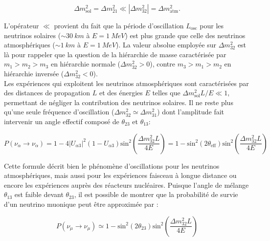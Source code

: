 \begin{equation}
    \Delta m^2_\textrm{sol} = \Delta m^2_{21} \ll \left| \Delta m_{32}^2 \right| = \Delta m^2_\textrm{atm}.
\end{equation}

\bigbreak

L'opérateur \og $\ll$ \fg{} provient du fait que la période d'oscillation $L_\textrm{osc}$ pour les neutrinos solaires ($\sim \SI{30}{km}$ à $E = \SI{1}{MeV}$) est plus grande que celle des neutrinos atmosphériques ($\sim \SI{1}{km}$ à $E = \SI{1}{MeV}$). La valeur absolue employée sur $\Delta m_{32}^2$ est là pour rappeler que la question de la hiérarchie de masse caractérisée par $m_1 > m_2 > m_3$ en hiérarchie \og normale \fg{} ($\Delta m_{32}^2 > 0$), contre $m_3 > m_1 > m_2$ en hiérarchie \og inversée \fg{} ($\Delta m_{32}^2 < 0$).\\

Les expériences qui exploitent les neutrinos atmosphériques sont caractérisées par des distances de propagation $L$ et des énergies $E$ telles que $\Delta m^2_\textrm{sol} L/E \ll 1$, permettant de négliger la contribution des neutrinos solaires. Il ne reste plus qu'une seule fréquence d'oscillation ($\Delta m^2_{32} \simeq \Delta m^2_{31}$) dont l'amplitude fait intervenir un angle effectif composé de $\theta_{23}$ et $\theta_{13}$:

\begin{equation}
\label{eq:general_atm_osc}
    P(\nu_\alpha \rightarrow \nu_\alpha ) = 1 - 4 \left|U_{\alpha 3}\right|^2 \left(1 - U_{\alpha 3}\right) \textrm{sin}^2\left(\frac{\Delta m^2_{32} L}{4E} \right) = 1 - \textrm{sin}^2\left(2 \theta_\textrm{eff} \right) \textrm{sin}^2\left(\frac{\Delta m^2_{32} L}{4E} \right)
\end{equation}

\bigbreak

Cette formule décrit bien le phénomène d'oscillations pour les neutrinos atmosphériques, mais aussi pour les expériences faisceau à longue distance ou encore les expériences auprès des réacteurs nucléaires. Puisque l'angle de mélange $\theta_{13}$ est faible devant $\theta_{23}$, il est possible de montrer que la probabilité de survie d'un neutrino muonique peut être approximée par :

\begin{equation}
    P(\nu_\mu \rightarrow \nu_\mu ) \simeq 1 - \textrm{sin}^2\left(2 \theta_{23} \right) \textrm{sin}^2\left(\frac{\Delta m^2_{32} L}{4E} \right)
\end{equation}


